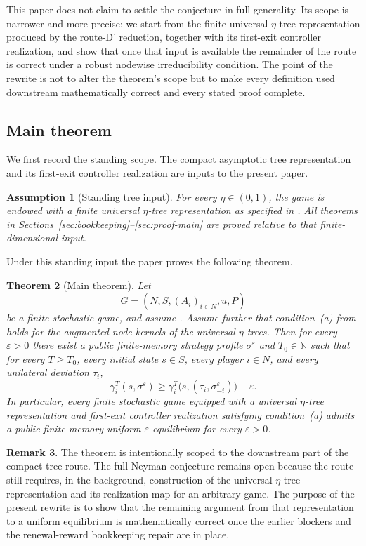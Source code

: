 \documentclass[12pt]{article}
\newtheorem{theorem}{Theorem}[section]
\newtheorem{assumption}[theorem]{Assumption}
\theoremstyle{definition}
\newtheorem{remark}[theorem]{Remark}
\newcommand{\eps}{\varepsilon}
\newcommand{\N}{\mathbb{N}}
\newcommand{\1}{\mathbf{1}}
\begin{document}
This paper does not claim to settle the conjecture in full generality. Its scope
is narrower and more precise: we start from the finite universal $\eta$-tree
representation produced by the route-D' reduction, together with its first-exit
controller realization, and show that once that input is available the remainder
of the route is correct under a robust nodewise irreducibility condition. The
point of the rewrite is not to alter the theorem's scope but to make every
definition used downstream mathematically correct and every stated proof complete.

\subsection{Main theorem}

We first record the standing scope. The compact asymptotic tree representation and
its first-exit controller realization are inputs to the present paper.

\begin{assumption}[Standing tree input]
\label{ass:tree-input}
For every $\eta\in(0,1)$, the game is endowed with a finite universal
$\eta$-tree representation as specified in
. All theorems in
Sections~\ref{sec:bookkeeping}--\ref{sec:proof-main} are proved relative to that
finite-dimensional input.
\end{assumption}

Under this standing input the paper proves the following theorem.

\begin{theorem}[Main theorem]
\label{thm:main}
Let
\[
G=(N,S,(A_i)_{i\in N},u,P)
\]
be a finite stochastic game, and assume . Assume further
that condition~\textnormal{(a)} from  holds for the augmented node
kernels of the universal $\eta$-trees. Then for every $\eps>0$ there exist a
public finite-memory strategy profile $\sigma^\eps$ and $T_0\in\N$ such that for
every $T\ge T_0$, every initial state $s\in S$, every player $i\in N$, and every
unilateral deviation $\tau_i$,
\[
\gamma_i^T(s,\sigma^\eps)
\ge
\gamma_i^T\bigl(s,(\tau_i,\sigma^\eps_{-i})\bigr)-\eps.
\]
In particular, every finite stochastic game equipped with a universal
$\eta$-tree representation and first-exit controller realization satisfying
condition~\textnormal{(a)} admits a public finite-memory uniform
$\eps$-equilibrium for every $\eps>0$.
\end{theorem}

\begin{remark}
The theorem is intentionally scoped to the downstream part of the compact-tree
route. The full Neyman conjecture remains open because the route still requires,
in the background, construction of the universal $\eta$-tree representation and
its realization map for an arbitrary game. The purpose of the present rewrite is
to show that the remaining argument from that representation to a uniform
equilibrium is mathematically correct once the earlier blockers and the
renewal-reward bookkeeping repair are in place.
\end{remark}
\end{document}

